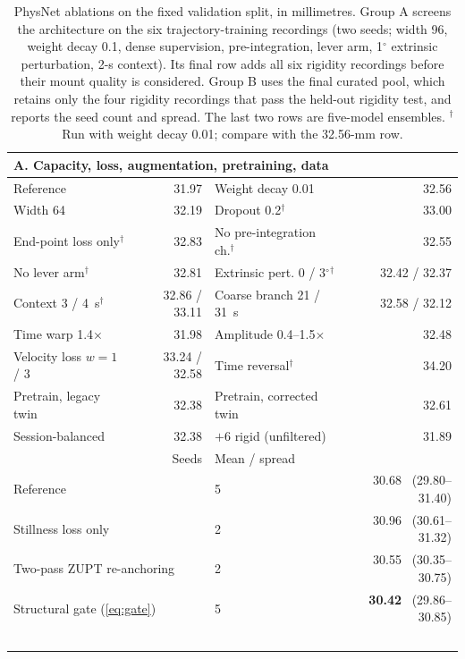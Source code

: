 \begin{table}[t]
\centering
\caption{PhysNet ablations on the fixed validation split, in millimetres.
Group A screens the architecture on the six trajectory-training recordings
(two seeds; width 96, weight decay 0.1, dense supervision, pre-integration,
lever arm, 1$^\circ$ extrinsic perturbation, 2-s context). Its final row adds
all six rigidity recordings before their mount quality is considered. Group B
uses the final curated pool, which retains only the four rigidity recordings
that pass the held-out rigidity test, and reports the seed count and spread.
The last two rows are five-model ensembles. $^\dagger$Run with weight decay
0.01; compare with the 32.56-mm row.}
\label{tab:ablation}
\scriptsize
\setlength{\tabcolsep}{2.5pt}
\begin{tabular}{lr@{\hspace{3pt}}lr}
\toprule
\multicolumn{4}{l}{\textbf{A. Capacity, loss, augmentation, pretraining, data}} \\
\midrule
Reference & 31.97 & Weight decay 0.01 & 32.56 \\
Width 64 & 32.19 & Dropout 0.2$^\dagger$ & 33.00 \\
End-point loss only$^\dagger$ & 32.83 & No pre-integration ch.$^\dagger$ & 32.55 \\
No lever arm$^\dagger$ & 32.81 & Extrinsic pert. 0 / 3$^\circ$$^\dagger$ & 32.42 / 32.37 \\
Context 3 / 4~s$^\dagger$ & 32.86 / 33.11 & Coarse branch 21 / 31~s & 32.58 / 32.12 \\
Time warp 1.4$\times$ & 31.98 & Amplitude 0.4--1.5$\times$ & 32.48 \\
Velocity loss $w{=}1$ / 3 & 33.24 / 32.58 & Time reversal$^\dagger$ & 34.20 \\
Pretrain, legacy twin & 32.38 & Pretrain, corrected twin & 32.61 \\
Session-balanced & 32.38 & $+$6 rigid (unfiltered) & 31.89 \\
\addlinespace[2pt]
\toprule
\multicolumn{2}{l}{\textbf{B. Zero velocity and uncertainty}} & Seeds & Mean / spread \\
\midrule
\multicolumn{2}{l}{Reference} & 5 & 30.68 \ (29.80--31.40) \\
\multicolumn{2}{l}{Stillness loss only} & 2 & 30.96 \ (30.61--31.32) \\
\multicolumn{2}{l}{Two-pass ZUPT re-anchoring} & 2 & 30.55 \ (30.35--30.75) \\
\multicolumn{2}{l}{Structural gate (\ref{eq:gate})} & 5 & \textbf{30.42} \ (29.86--30.85) \\
$$
\end{tabular}
\end{table}
